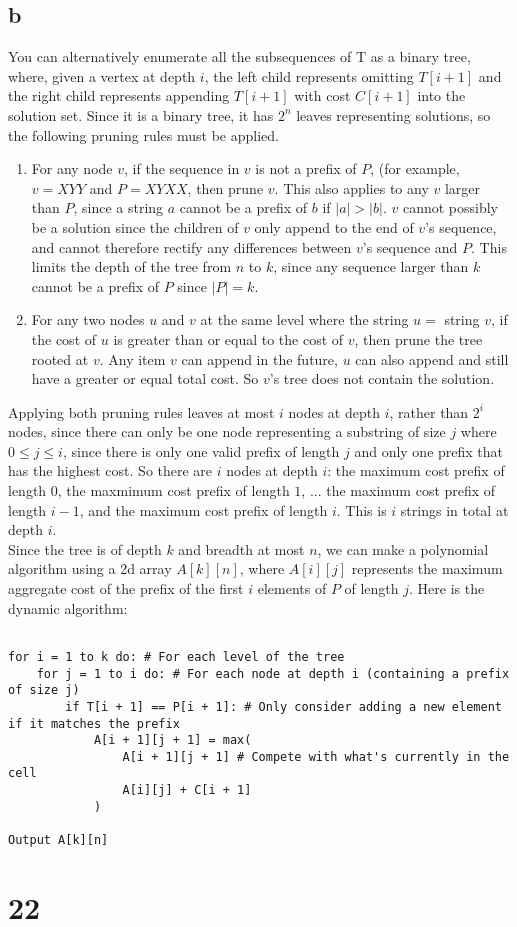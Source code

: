 \documentclass[letterpaper,notitlepage,twoside]{article}
\begin{document}
\subsection*{b}
You can alternatively enumerate all the subsequences of T as a binary tree, where, given a vertex at depth $i$, the left child represents omitting $T[i + 1]$ and the right child represents appending $T[i + 1]$ with cost $C[i + 1]$ into the solution set. Since it is a binary tree, it has $2^n$ leaves representing solutions, so the following pruning rules must be applied.
\begin{enumerate}
\item For any node $v$, if the sequence in $v$ is not a prefix of $P$, (for example, $v = XYY$ and $P = XYXX$, then prune $v$. This also applies to any $v$ larger than $P$, since a string $a$ cannot be a prefix of $b$ if $|a| > |b|$. $v$ cannot possibly be a solution since the children of $v$ only append to the end of $v$'s sequence, and cannot therefore rectify any differences between $v$'s sequence and $P$. This limits the depth of the tree from $n$ to $k$, since any sequence larger than $k$ cannot be a prefix of $P$ since $|P| = k$.
\item For any two nodes $u$ and $v$ at the same level where the string $u = $ string $v$, if the cost of $u$ is greater than or equal to the cost of $v$, then prune the tree rooted at $v$. Any item $v$ can append in the future, $u$ can also append and still have a greater or equal total cost. So $v$'s tree does not contain the solution.
\end{enumerate}
Applying both pruning rules leaves at most $i$ nodes at depth $i$, rather than $2^i$ nodes, since there can only be one node representing a substring of size $j$ where $0 \leq j \leq i$, since there is only one valid prefix of length $j$ and only one prefix that has the highest cost. So there are $i$ nodes at depth $i$: the maximum cost prefix of length $0$, the maxmimum cost prefix of length $1$, ... the maximum cost prefix of length $i - 1$, and the maximum cost prefix of length $i$. This is $i$ strings in total at depth $i$. \\

Since the tree is of depth $k$ and breadth at most $n$, we can make a polynomial algorithm using a 2d array $A[k][n]$, where $A[i][j]$ represents the maximum aggregate cost of the prefix of the first $i$ elements of $P$ of length $j$. Here is the dynamic algorithm:
\begin{verbatim}

for i = 1 to k do: # For each level of the tree
    for j = 1 to i do: # For each node at depth i (containing a prefix of size j)
        if T[i + 1] == P[i + 1]: # Only consider adding a new element if it matches the prefix
            A[i + 1][j + 1] = max(
                A[i + 1][j + 1] # Compete with what's currently in the cell
                A[i][j] + C[i + 1]
            )

Output A[k][n]
\end{verbatim}

\section*{22}
\end{document}

